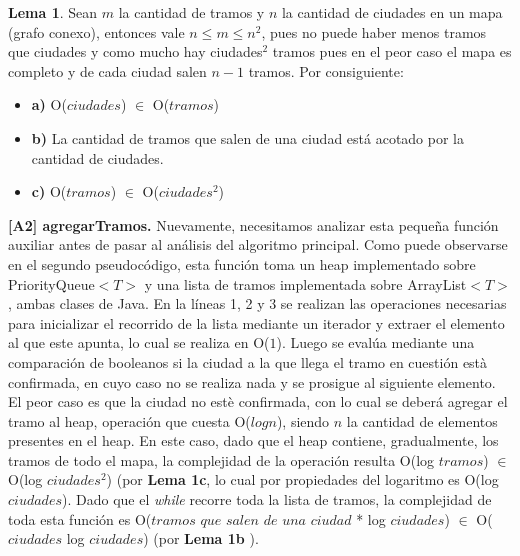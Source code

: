 \textbf{Lema 1}. Sean $m$ la cantidad de tramos y $n$ la cantidad de ciudades en un mapa (grafo conexo), entonces vale $n \leq m \leq n^2$, pues no puede haber menos tramos que ciudades y como mucho hay ciudades$^2$ tramos pues en el peor caso el mapa es completo y de cada ciudad salen $n-1$ tramos. Por consiguiente:
\begin{itemize}
	\item \textbf{a)} O($ciudades$) $\in$ O($tramos$)
	\item \textbf{b)} La cantidad de tramos que salen de una ciudad está acotado por la cantidad de ciudades.
	\item \textbf{c)} O($tramos$) $\in$ O($ciudades^2$)
\end{itemize}

\textbf{[A2] agregarTramos.} Nuevamente, necesitamos analizar esta pequeña función auxiliar antes de pasar al análisis del algoritmo principal. Como puede observarse en el segundo pseudocódigo, esta función toma un heap implementado sobre PriorityQueue$<T>$ y una lista de tramos implementada sobre ArrayList$<T>$, ambas clases de Java. En la líneas 1, 2 y 3 se realizan las operaciones necesarias para inicializar el recorrido de la lista mediante un iterador y extraer el elemento al que este apunta, lo cual se realiza en O($1$). Luego se evalúa mediante una comparación de booleanos si la ciudad a la que llega el tramo en cuestión està confirmada, en cuyo caso no se realiza nada y se prosigue al siguiente elemento. El peor caso es que la ciudad no estè confirmada, con lo cual se deberá agregar el tramo al heap, operación que cuesta O($log n$), siendo $n$ la cantidad de elementos presentes en el heap. En este caso, dado que el heap contiene, gradualmente, los tramos de todo el mapa, la complejidad de la operación resulta O(log $tramos$) $\in$ O(log $ciudades^2$) (por \textbf{Lema 1c}, lo cual por propiedades del logaritmo es O(log $ciudades$). Dado que el \textit{while} recorre toda la lista de tramos, la complejidad de toda esta función es O($tramos$ $que$ $salen$ $de$ $una$ $ciudad$ * log $ciudades$) $\in$ O($ciudades$ log $ciudades$) (por \textbf{Lema 1b} ).\\

